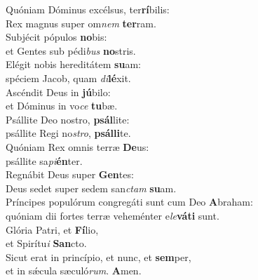 \evenverse Quóniam Dóminus excélsus, ter\textbf{rí}bilis:~\*\\
\evenverse Rex magnus super om\textit{nem} \textbf{ter}ram.\\
\oddverse Subjécit pópulos \textbf{no}bis:~\*\\
\oddverse et Gentes sub pédi\textit{bus} \textbf{no}stris.\\
\evenverse Elégit nobis hereditátem \textbf{su}am:~\*\\
\evenverse spéciem Jacob, quam \textit{di}\textbf{lé}xit.\\
\oddverse Ascéndit Deus in \textbf{jú}bilo:~\*\\
\oddverse et Dóminus in vo\textit{ce} \textbf{tu}bæ.\\
\evenverse Psállite Deo nostro, \textbf{psál}lite:~\*\\
\evenverse psállite Regi no\textit{stro}, \textbf{psál}\textbf{li}te.\\
\oddverse Quóniam Rex omnis terræ \textbf{De}us:~\*\\
\oddverse psállite sa\textit{pi}\textbf{én}ter.\\
\evenverse Regnábit Deus super \textbf{Gen}tes:~\*\\
\evenverse Deus sedet super sedem san\textit{ctam} \textbf{su}am.\\
\oddverse Príncipes populórum congregáti sunt cum Deo \textbf{A}braham:~\*\\
\oddverse quóniam dii fortes terræ veheménter e\textit{le}\textbf{vá}\textbf{ti} sunt.\\
\evenverse Glória Patri, et \textbf{Fí}lio,~\*\\
\evenverse et Spirítu\textit{i} \textbf{San}cto.\\
\oddverse Sicut erat in princípio, et nunc, et \textbf{sem}per,~\*\\
\oddverse et in sǽcula sæculó\textit{rum}. \textbf{A}men.\\
